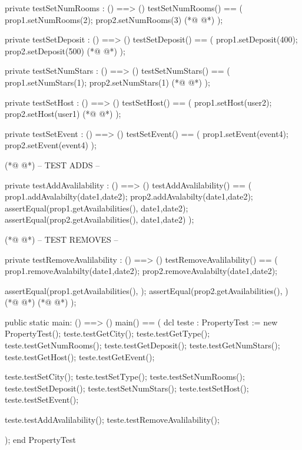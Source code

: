 \begin{vdmpp}[breaklines=true]
 private testSetNumRooms : () ==> ()
  testSetNumRooms() == 
  (
   prop1.setNumRooms(2);
   prop2.setNumRooms(3)
(*@
\label{testSetDeposit:211}
@*)
  );
 
 private testSetDeposit : () ==> ()
  testSetDeposit() == 
  (
   prop1.setDeposit(400);
   prop2.setDeposit(500)
(*@
\label{testSetNumStars:218}
@*)
  );
  
 private testSetNumStars : () ==> ()
  testSetNumStars() == 
  (
   prop1.setNumStars(1);
   prop2.setNumStars(1)
(*@
\label{testSetHost:225}
@*)
  );
  
 private testSetHost : () ==> ()
  testSetHost() == 
  (
   prop1.setHost(user2);
   prop2.setHost(user1)
(*@
\label{testSetEvent:232}
@*)
  );
  
 private testSetEvent : () ==> ()
  testSetEvent() == 
  (
   prop1.setEvent(event4);
   prop2.setEvent(event4)
  );
  
  
(*@
\label{testAddAvalilability:242}
@*)
 -- TEST ADDS -- 
 
 private testAddAvalilability : () ==> ()
  testAddAvalilability() ==
  (
   prop1.addAvalabilty(date1,date2);
   prop2.addAvalabilty(date1,date2);
   assertEqual(prop1.getAvailabilities(), {date1,date2});
   assertEqual(prop2.getAvailabilities(), {date1,date2})
  );
 
(*@
\label{testRemoveAvalilability:253}
@*)
 -- TEST REMOVES --
 
 private testRemoveAvalilability : () ==> ()
  testRemoveAvalilability() ==
  (
   prop1.removeAvalabilty(date1,date2);
   prop2.removeAvalabilty(date1,date2);
   
   assertEqual(prop1.getAvailabilities(), {});
   assertEqual(prop2.getAvailabilities(), {})
(*@
\label{testCreatePropInvariant:263}
@*)
(*@
\label{main:263}
@*)
  );
   
 public static main: () ==> ()
  main() ==
  (
   dcl teste : PropertyTest := new PropertyTest();
   teste.testGetCity();
   teste.testGetType();
   teste.testGetNumRooms();
   teste.testGetDeposit();
   teste.testGetNumStars();
   teste.testGetHost();
   teste.testGetEvent();
   
   teste.testSetCity();
   teste.testSetType();
   teste.testSetNumRooms();
   teste.testSetDeposit();
   teste.testSetNumStars();
   teste.testSetHost();
   teste.testSetEvent();
   
   teste.testAddAvalilability();
   teste.testRemoveAvalilability();
   
  );
end PropertyTest
\end{vdmpp}
